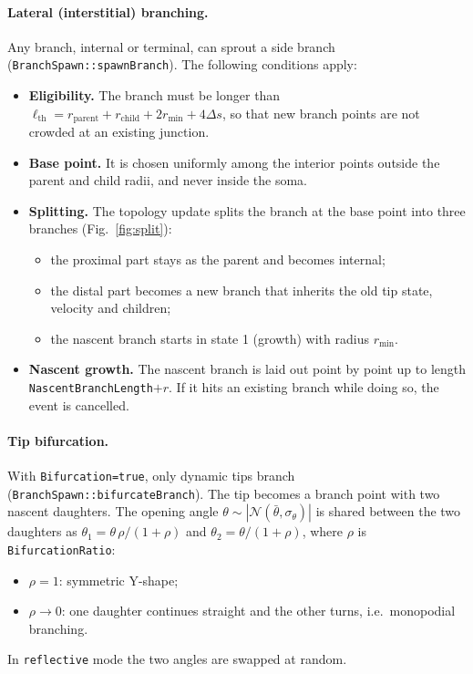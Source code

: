 \documentclass[11pt,a4paper]{article}
\newcommand{\code}[1]{\texttt{#1}}
\begin{document}
\paragraph{Lateral (interstitial) branching.}
Any branch, internal or terminal, can sprout a side branch (\code{BranchSpawn::\allowbreak spawnBranch}). The following conditions apply:
\begin{itemize}
  \item \textbf{Eligibility.} The branch must be longer than $\ell_\text{th}=r_\text{parent}+r_\text{child}+2r_\text{min}+4\Delta s$, so that new branch points are not crowded at an existing junction.
  \item \textbf{Base point.} It is chosen uniformly among the interior points outside the parent and child radii, and never inside the soma.
  \item \textbf{Splitting.} The topology update splits the branch at the base point into three branches (Fig.~\ref{fig:split}):
  \begin{itemize}
    \item the proximal part stays as the parent and becomes internal;
    \item the distal part becomes a new branch that inherits the old tip state, velocity and children;
    \item the nascent branch starts in state 1 (growth) with radius $r_\text{min}$.
  \end{itemize}
  \item \textbf{Nascent growth.} The nascent branch is laid out point by point up to length \code{NascentBranchLength}$+r$. If it hits an existing branch while doing so, the event is cancelled.
\end{itemize}

\paragraph{Tip bifurcation.}
With \code{Bifurcation=true}, only dynamic tips branch (\code{BranchSpawn::\allowbreak bifurcateBranch}). The tip becomes a branch point with two nascent daughters. The opening angle $\theta\sim|\mathcal N(\bar\theta,\sigma_\theta)|$ is shared between the two daughters as $\theta_1=\theta\,\rho/(1+\rho)$ and $\theta_2=\theta/(1+\rho)$, where $\rho$ is \code{BifurcationRatio}:
\begin{itemize}
  \item $\rho=1$: symmetric Y-shape;
  \item $\rho\to0$: one daughter continues straight and the other turns, i.e.\ monopodial branching.
\end{itemize}
In \code{reflective} mode the two angles are swapped at random.
\end{document}
